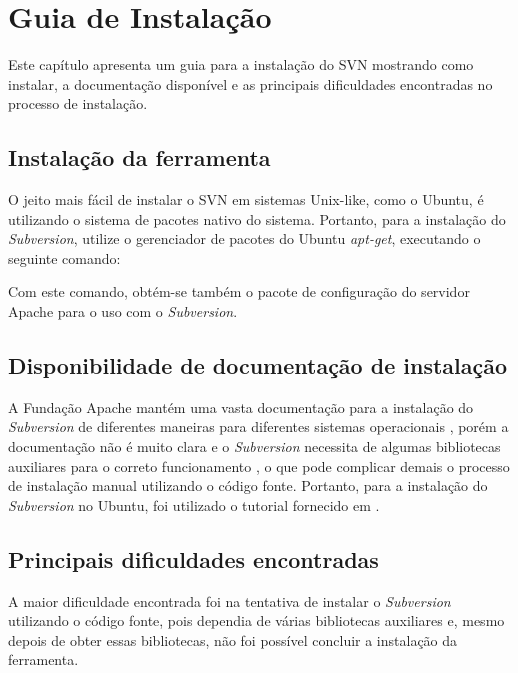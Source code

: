 \chapter[Guia de Instalação]{Guia de Instalação}
  
  Este capítulo apresenta um guia para a instalação do SVN mostrando como instalar, a documentação disponível e as
  principais dificuldades encontradas no processo de instalação.
    

\section{Instalação da ferramenta}
    
    O jeito mais fácil de instalar o SVN em sistemas Unix-like, como o Ubuntu,
    é utilizando o sistema de pacotes nativo do sistema. Portanto, para a instalação do \textit{Subversion},
    utilize o gerenciador de pacotes do Ubuntu \textit{apt-get}, executando o seguinte comando:
    
    \colorbox{Gray}{
      \begin{minipage}{0.6\linewidth}
      \end{minipage}
    }
    
    Com este comando, obtém-se também o pacote de configuração do servidor Apache para o uso com o \textit{Subversion}.
  
\section{Disponibilidade de documentação de instalação}
  
  A Fundação Apache mantém uma vasta documentação para a instalação do \textit{Subversion} de diferentes maneiras
  para diferentes sistemas operacionais \footnotemark, porém a documentação não é muito clara e o \textit{Subversion} necessita
  de algumas bibliotecas auxiliares para o correto funcionamento \cite{svn-book}, o que pode complicar demais o processo
  de instalação manual utilizando o código fonte. Portanto, para a instalação do \textit{Subversion} no Ubuntu, foi utilizado o
  tutorial fornecido em .
  
  
\section{Principais dificuldades encontradas}
  
  A maior dificuldade encontrada foi na tentativa de instalar o \textit{Subversion} utilizando o código fonte, pois dependia de 
  várias bibliotecas auxiliares e, mesmo depois de obter essas bibliotecas, não foi possível concluir a instalação da
  ferramenta.